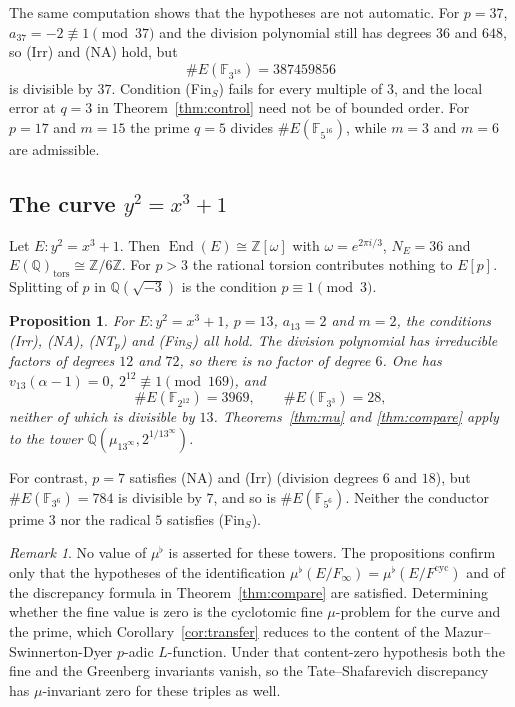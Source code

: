 \documentclass[11pt]{article}
\newtheorem{proposition}[theorem]{Proposition}
\theoremstyle{definition}
\theoremstyle{remark}
\newtheorem{remark}[theorem]{Remark}
\newcommand{\Z}{\mathbb{Z}}
\newcommand{\Q}{\mathbb{Q}}
\newcommand{\F}{\mathbb{F}}
\newcommand{\End}{\operatorname{End}}
\newcommand{\cyc}{\mathrm{cyc}}
\newcommand{\flatp}{\flat}
\begin{document}
The same computation shows that the hypotheses are not automatic. For \(p=37\), \(a_{37}=-2\not\equiv 1\pmod{37}\) and the division polynomial still has degrees \(36\) and \(648\), so (Irr) and (NA) hold, but
\[
\#E(\F_{3^{18}})=387459856
\]
is divisible by \(37\). Condition (Fin\(_S\)) fails for every multiple of \(3\), and the local error at \(q=3\) in Theorem~\ref{thm:control} need not be of bounded order. For \(p=17\) and \(m=15\) the prime \(q=5\) divides \(\#E(\F_{5^{16}})\), while \(m=3\) and \(m=6\) are admissible.

\subsection{The curve \(y^2=x^3+1\)}

Let \(E:y^2=x^3+1\). Then \(\End(E)\cong\Z[\omega]\) with \(\omega=e^{2\pi i/3}\), \(N_E=36\) and \(E(\Q)_{\mathrm{tors}}\cong\Z/6\Z\). For \(p>3\) the rational torsion contributes nothing to \(E[p]\). Splitting of \(p\) in \(\Q(\sqrt{-3})\) is the condition \(p\equiv 1\pmod{3}\).

\begin{proposition}
\label{prop:ex2}
For \(E:y^2=x^3+1\), \(p=13\), \(a_{13}=2\) and \(m=2\), the conditions \textup{(Irr)}, \textup{(NA)}, \textup{(NT\(_p\))} and \textup{(Fin\(_S\))} all hold. The division polynomial has irreducible factors of degrees \(12\) and \(72\), so there is no factor of degree \(6\). One has \(v_{13}(\alpha-1)=0\), \(2^{12}\not\equiv 1\pmod{169}\), and
\[
\#E(\F_{2^{12}})=3969,\qquad \#E(\F_{3^{3}})=28,
\]
neither of which is divisible by \(13\). Theorems~\ref{thm:mu} and \ref{thm:compare} apply to the tower \(\Q(\mu_{13^\infty},2^{1/13^\infty})\).
\end{proposition}

For contrast, \(p=7\) satisfies (NA) and (Irr) (division degrees \(6\) and \(18\)), but \(\#E(\F_{3^6})=784\) is divisible by \(7\), and so is \(\#E(\F_{5^6})\). Neither the conductor prime \(3\) nor the radical \(5\) satisfies (Fin\(_S\)).

\begin{remark}
No value of \(\mu^{\flatp}\) is asserted for these towers. The propositions confirm only that the hypotheses of the identification \(\mu^{\flatp}(E/F_\infty)=\mu^{\flatp}(E/F^{\cyc})\) and of the discrepancy formula in Theorem~\ref{thm:compare} are satisfied. Determining whether the fine value is zero is the cyclotomic fine \(\mu\)-problem for the curve and the prime, which Corollary~\ref{cor:transfer} reduces to the content of the Mazur--Swinnerton-Dyer \(p\)-adic \(L\)-function. Under that content-zero hypothesis both the fine and the Greenberg invariants vanish, so the Tate--Shafarevich discrepancy has \(\mu\)-invariant zero for these triples as well.
\end{remark}
\end{document}
